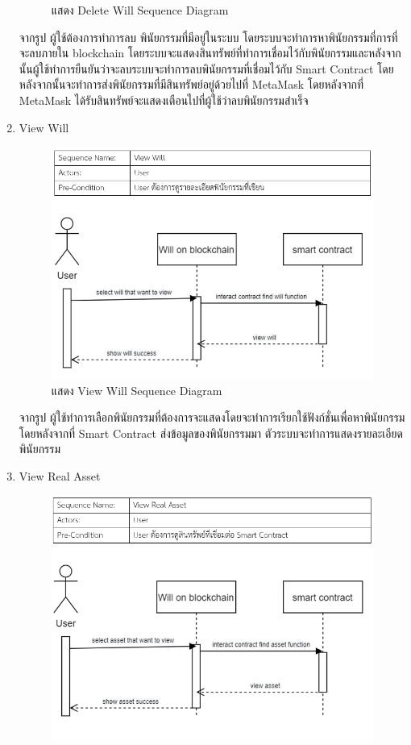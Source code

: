 \documentclass[12pt,oneside,openright,a4paper]{cpe-thai-project}
\begin{document}
\begin{enumerate}[label=\thesubsection.\arabic*,leftmargin=0pt,itemindent=2.5cm]
\begin{figure}[!thb]
			\caption{แสดง Delete Will Sequence Diagram}
		\end{figure}
		\FloatBarrier
	\tab จากรูป ผู้ใช้ต้องการทำการลบ พินัยกรรมที่มีอยู่ในระบบ โดยระบบจะทำการหาพินัยกรรมที่การที่จะลบภายใน blockchain โดยระบบจะแสดงสินทรัพย์ที่ทำการเชื่อมไว้กับพินัยกรรมและหลังจากนั้นผู้ใช้ทำการยืนยันว่าจะลบระบบจะทำการลบพินัยกรรมที่เชื่อมไว้กับ Smart Contract โดยหลังจากนั้นจะทำการส่งพินัยกรรมที่มีสินทรัพย์อยู่ด้วยไปที่ MetaMask โดยหลังจากที่ MetaMask ได้รับสินทรัพย์จะแสดงเตือนไปที่ผู้ใช้ว่าลบพินัยกรรมสำเร็จ
	\item View Will
		\begin{figure}[!thb]
			\centering
			\includegraphics[scale=0.6]{viewWillseq}
			\caption{แสดง View Will Sequence Diagram}
		\end{figure}
		\FloatBarrier
	\tab จากรูป ผู้ใช้ทำการเลือกพินัยกรรมที่ต้องการจะแสดงโดยจะทำการเรียกใช้ฟังก์ชั่นเพื่อหาพินัยกรรมโดยหลังจากที่ Smart Contract ส่งข้อมูลของพินัยกรรมมา ตัวระบบจะทำการแสดงรายละเอียดพินัยกรรม
	\item View Real Asset
		\begin{figure}[!thb]
			\centering
			\includegraphics[scale=0.6]{viewRealAssetseq}

\end{figure}
\end{enumerate}
\end{document}
